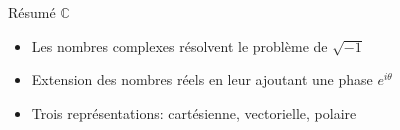 \documentclass[aspectratio=169,12pt]{beamer}
\begin{document}
\begin{frame}{Résumé $\mathbb{C}$}

  \vspace{2mm}
  \begin{itemize}
    \setlength{\itemsep}{0.9em}
    \item Les nombres complexes résolvent le problème de $\sqrt{-1}$
    \item Extension des nombres réels en leur ajoutant une phase $e^{i\theta}$
    \item Trois représentations: cartésienne, vectorielle, polaire
  \end{itemize}

  \begin{center}
    \vspace{2mm}
  \end{center}

\end{frame}
\end{document}
